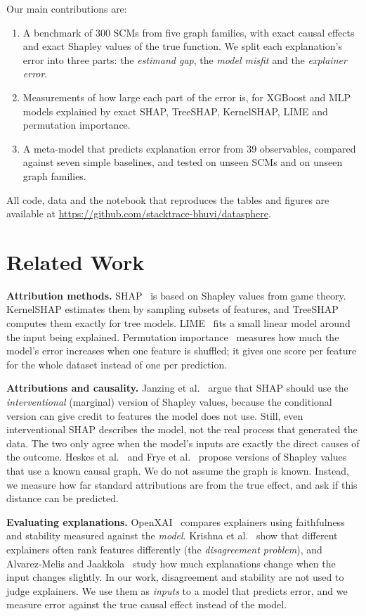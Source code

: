 Our main contributions are:
\begin{enumerate}
  \item A benchmark of 300 SCMs from five graph families, with exact causal effects and exact Shapley values of the true function. We split each explanation's error into three parts: the \emph{estimand gap}, the \emph{model misfit} and the \emph{explainer error}.
  \item Measurements of how large each part of the error is, for XGBoost and MLP models explained by exact SHAP, TreeSHAP, KernelSHAP, LIME and permutation importance.
  \item A meta-model that predicts explanation error from 39 observables, compared against seven simple baselines, and tested on unseen SCMs and on unseen graph families.
\end{enumerate}
All code, data and the notebook that reproduces the tables and figures are available at \url{https://github.com/stacktrace-bhuvi/datasphere}.

\section{Related Work}
\textbf{Attribution methods.} SHAP~\cite{lundberg2017} is based on Shapley values from game theory. KernelSHAP estimates them by sampling subsets of features, and TreeSHAP computes them exactly for tree models. LIME~\cite{ribeiro2016} fits a small linear model around the input being explained. Permutation importance~\cite{breiman2001} measures how much the model's error increases when one feature is shuffled; it gives one score per feature for the whole dataset instead of one per prediction.

\textbf{Attributions and causality.} Janzing et al.~\cite{janzing2020} argue that SHAP should use the \emph{interventional} (marginal) version of Shapley values, because the conditional version can give credit to features the model does not use. Still, even interventional SHAP describes the model, not the real process that generated the data. The two only agree when the model's inputs are exactly the direct causes of the outcome. Heskes et al.~\cite{heskes2020} and Frye et al.~\cite{frye2020} propose versions of Shapley values that use a known causal graph. We do not assume the graph is known. Instead, we measure how far standard attributions are from the true effect, and ask if this distance can be predicted.

\textbf{Evaluating explanations.} OpenXAI~\cite{agarwal2022} compares explainers using faithfulness and stability measured against the \emph{model}. Krishna et al.~\cite{krishna2022} show that different explainers often rank features differently (the \emph{disagreement problem}), and Alvarez-Melis and Jaakkola~\cite{alvarez2018} study how much explanations change when the input changes slightly. In our work, disagreement and stability are not used to judge explainers. We use them as \emph{inputs} to a model that predicts error, and we measure error against the true causal effect instead of the model.

